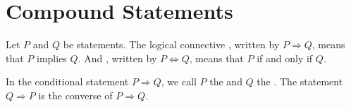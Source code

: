 



\section{Compound Statements}

\begin{defn}
Let $P$ and $Q$ be statements.
The logical connective , written by $P\Rightarrow Q$, means that
$P$ implies $Q$.
And , written by $P\Leftrightarrow Q$, means that
$P$ if and only if $Q$.

In the conditional statement $P\Rightarrow Q$, we call $P$ the  and
$Q$ the .
The statement $Q\Rightarrow P$ is the converse of $P\Rightarrow Q$.
\end{defn}


